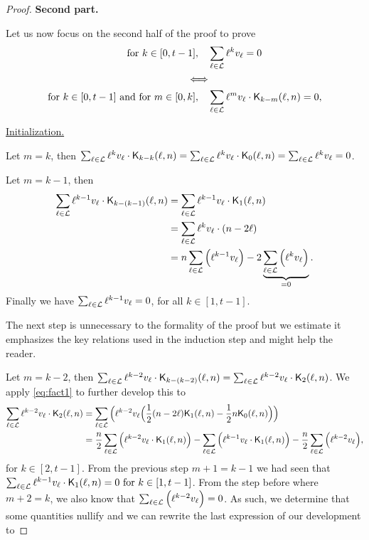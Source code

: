 \begin{proof}
    \textbf{Second part.}

    Let us now focus on the second half of the proof to prove
    \begin{equation*}
        \begin{split}
            \text{for } k \in [0, t-1], \quad &\sum_{\ell \in \mathcal{L}} \ell^kv_\ell = 0\\
            \Longleftrightarrow\\
            \text{for } k \in [0, t-1] \text{ and for } m \in [0, k], \quad &\sum_{\ell \in \mathcal{L}} \ell^mv_\ell \cdot \mathsf{K}_{k-m}(\ell,n) = 0,
        \end{split}
    \end{equation*}

    \underline{Initialization.}

    Let $m = k$, then $\sum_{\ell \in \mathcal{L}} \ell^kv_\ell \cdot \mathsf{K}_{k-k}(\ell,n) = \sum_{\ell \in \mathcal{L}} \ell^kv_\ell \cdot \mathsf{K}_{0}(\ell,n) = \sum_{\ell \in \mathcal{L}} \ell^kv_\ell = 0$.

    Let $m = k - 1$, then
    \begin{equation*}
        \begin{split}
            \sum_{\ell \in \mathcal{L}} \ell^{k-1}v_\ell \cdot \mathsf{K}_{k-(k-1)}(\ell,n) &= \sum_{\ell \in \mathcal{L}} \ell^{k-1}v_\ell \cdot \mathsf{K}_{1}(\ell,n)\\
            &= \sum_{\ell \in \mathcal{L}} \ell^kv_\ell \cdot (n - 2\ell)\\
            &= n\sum_{\ell \in \mathcal{L}} \Big( \ell^{k-1}v_\ell \Big) - 2\underbrace{\sum_{\ell \in \mathcal{L}} \Big( \ell^kv_\ell \Big)}_{=0}.
        \end{split}
    \end{equation*}
    Finally we have $\sum_{\ell \in \mathcal{L}} \ell^{k-1}v_\ell = 0$, for all $k \in [1, t-1]$.

    The next step is unnecessary to the formality of the proof but we estimate it emphasizes the key relations used in the induction step and might help the reader.

    Let $m = k - 2$, then $\sum_{\ell \in \mathcal{L}} \ell^{k-2}v_\ell \cdot \mathsf{K}_{k-(k-2)}(\ell,n) = \sum_{\ell \in \mathcal{L}} \ell^{k-2}v_\ell \cdot \mathsf{K}_{2}(\ell,n)$.
    We apply \cref{eq:fact1} to further develop this to
    \begin{equation*}
        \begin{split}
            \sum_{\ell \in \mathcal{L}} \ell^{k-2}v_\ell \cdot \mathsf{K}_{2}(\ell,n) &= \sum_{\ell \in \mathcal{L}} \Big( \ell^{k-2}v_\ell \Big( \frac{1}{2}(n - 2\ell)\mathsf{K}_{1}(\ell,n) - \frac{1}{2}n\mathsf{K}_{0}(\ell,n) \Big)\Big)\\
            &= \frac{n}{2}\sum_{\ell \in \mathcal{L}} \Big( \ell^{k-2}v_\ell \cdot \mathsf{K}_{1}(\ell,n) \Big) - \sum_{\ell \in \mathcal{L}} \Big( \ell^{k-1}v_\ell \cdot \mathsf{K}_{1}(\ell,n) \Big) - \frac{n}{2}\sum_{\ell \in \mathcal{L}} \Big( \ell^{k-2}v_\ell \Big),
        \end{split}
    \end{equation*}
    for $k \in [2, t-1]$.
    From the previous step $m + 1 = k - 1$ we had seen that $\sum_{\ell \in \mathcal{L}} \ell^{k-1}v_\ell \cdot \mathsf{K}_{1}(\ell,n) = 0\text{ for } k \in [1, t-1]$. From the step before where $m + 2 = k$, we also know that $\sum_{\ell \in \mathcal{L}} \Big( \ell^{k-2}v_\ell \Big) = 0$.
    As such, we determine that some quantities nullify and we can rewrite the last expression of our development to


\end{proof}
